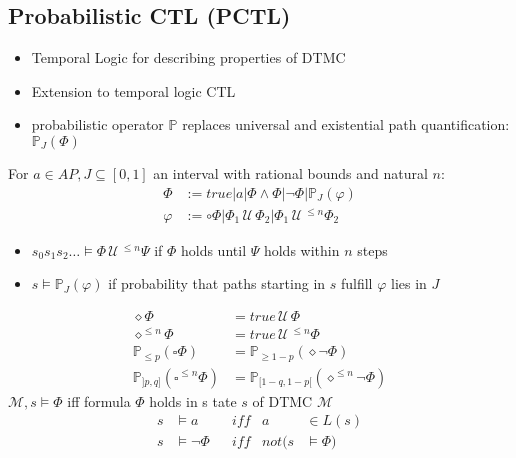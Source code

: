 \documentclass[a4paper, 10pt]{article}
\newcommand{\until}{\,\mathcal{U}\,}
\begin{document}
\subsection{Probabilistic CTL (PCTL)}
\begin{mdframed}[roundcorner=5pt,
subtitlebelowline=false,subtitleaboveline=false,
subtitlebackgroundcolor=blue!30,
frametitlerule=true,
frametitlebackgroundcolor=blue!30,
frametitle={Probabilistic CTL (PCTL)}
]
\begin{itemize}
    \item Temporal Logic for describing properties of DTMC
    \item Extension to temporal logic CTL
    \item probabilistic operator $\mathbb{P}$ replaces universal and existential path quantification: $\mathbb{P}_J(\Phi)$
\end{itemize}
For $a\in AP, J\subseteq [0,1]$ an interval with rational bounds and natural $n$:
\begin{align*}
\Phi &:= true | a | \Phi\wedge\Phi | \neg\Phi | \mathbb{P}_J(\varphi) \\
\varphi &:= \circ\Phi | \Phi_1\until\Phi_2 | \Phi_1\until^{\leq n}\Phi_2
\end{align*}
\begin{itemize}
    \item $s_0s_1s_2\dots\models\Phi\until^{\leq n}\Psi$ if $\Phi$ holds until $\Psi$ holds within $n$ steps
    \item $s\models\mathbb{P}_J(\varphi)$ if probability that paths starting in $s$ fulfill $\varphi$ lies in $J$
\end{itemize}
\begin{align*}
\diamond\Phi &= true\until\Phi \\
\diamond^{\leq n}\Phi &= true\until^{\leq n}\Phi \\
\mathbb{P}_{\leq p}(\square\Phi) &= \mathbb{P}_{\geq 1-p}(\diamond\neg\Phi) \\
\mathbb{P}_{]p,q]}(\square^{\leq n}\Phi) &= \mathbb{P}_{[1-q,1-p[}(\diamond^{\leq n}\neg\Phi)
\end{align*}
$\mathcal{M},s\models\Phi$ iff formula $\Phi$ holds in s tate $s$ of DTMC $\mathcal{M}$
\begin{align*}
s&\models a && iff & a&\in L(s)\\
s&\models \neg \Phi && iff & not(s&\models\Phi)\\

\end{align*}
\end{mdframed}
\end{document}
